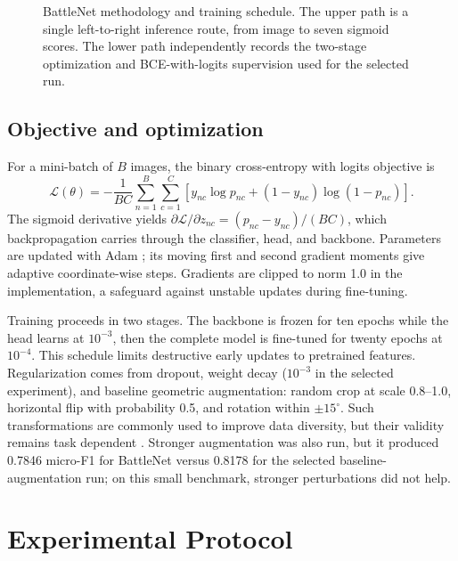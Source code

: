 \documentclass[conference]{IEEEtran}
\begin{document}
\begin{figure}[!t]
{}
\caption{BattleNet methodology and training schedule. The upper path is a single left-to-right inference route, from image to seven sigmoid scores. The lower path independently records the two-stage optimization and BCE-with-logits supervision used for the selected run.}
\label{fig:architecture}
\end{figure}

\subsection{Objective and optimization}
For a mini-batch of $B$ images, the binary cross-entropy with logits objective is
\begin{equation}
\mathcal{L}(\theta)=-\frac{1}{BC}\sum_{n=1}^{B}\sum_{c=1}^{C}\left[y_{nc}\log p_{nc}+(1-y_{nc})\log(1-p_{nc})\right].
\label{eq:bce}
\end{equation}
The sigmoid derivative yields $\partial\mathcal{L}/\partial z_{nc}=(p_{nc}-y_{nc})/(BC)$, which backpropagation carries through the classifier, head, and backbone. Parameters are updated with Adam \cite{kingma2015adam}; its moving first and second gradient moments give adaptive coordinate-wise steps. Gradients are clipped to norm 1.0 in the implementation, a safeguard against unstable updates during fine-tuning.

Training proceeds in two stages. The backbone is frozen for ten epochs while the head learns at $10^{-3}$, then the complete model is fine-tuned for twenty epochs at $10^{-4}$. This schedule limits destructive early updates to pretrained features. Regularization comes from dropout, weight decay ($10^{-3}$ in the selected experiment), and baseline geometric augmentation: random crop at scale 0.8--1.0, horizontal flip with probability 0.5, and rotation within $\pm15^\circ$. Such transformations are commonly used to improve data diversity, but their validity remains task dependent \cite{shorten2019augmentation}. Stronger augmentation was also run, but it produced 0.7846 micro-F1 for BattleNet versus 0.8178 for the selected baseline-augmentation run; on this small benchmark, stronger perturbations did not help.

\section{Experimental Protocol}
\end{document}
